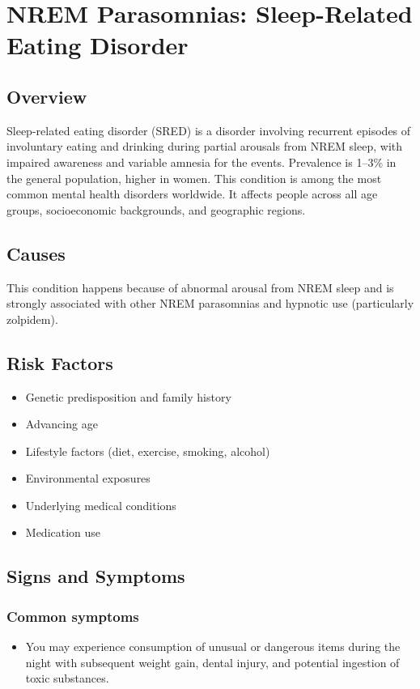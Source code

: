 \chapter{NREM Parasomnias: Sleep-Related Eating Disorder}
\label{sec:Sleep-Related Eating Disorder}

\section{Overview}
Sleep-related eating disorder (SRED) is a disorder involving recurrent episodes of involuntary eating and drinking during partial arousals from NREM sleep, with impaired awareness and variable amnesia for the events. Prevalence is 1--3\% in the general population, higher in women. This condition is among the most common mental health disorders worldwide. It affects people across all age groups, socioeconomic backgrounds, and geographic regions.
\section{Causes}
This condition happens because of abnormal arousal from NREM sleep and is strongly associated with other NREM parasomnias and hypnotic use (particularly zolpidem).     
\section{Risk Factors}

\begin{itemize}[noitemsep]
  \item Genetic predisposition and family history
  \item Advancing age
  \item Lifestyle factors (diet, exercise, smoking, alcohol)
  \item Environmental exposures
  \item Underlying medical conditions
  \item Medication use
\end{itemize}
\section{Signs and Symptoms}

\subsection{Common symptoms}
\begin{itemize}[noitemsep]
  \item You may experience consumption of unusual or dangerous items during the night with subsequent weight gain, dental injury, and potential ingestion of toxic substances. 
  \end{itemize}

